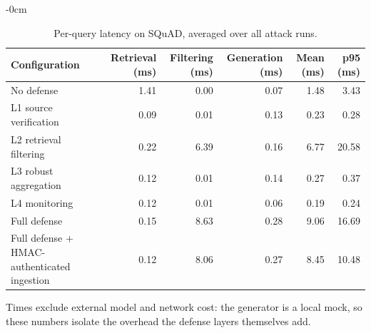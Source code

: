 \begin{table}[t]
\begin{adjustwidth}{-\extralength}{0cm}
\centering
\footnotesize
\setlength{\tabcolsep}{3pt}
\caption{Per-query latency on SQuAD, averaged over all attack runs.\label{tab:latency}}
\begin{tabular}{lrrrrr}
\toprule
\textbf{Configuration} & \textbf{Retrieval (ms)} & \textbf{Filtering (ms)} & \textbf{Generation (ms)} & \textbf{Mean (ms)} & \textbf{p95 (ms)}\\
\midrule
No defense & 1.41 & 0.00 & 0.07 & 1.48 & 3.43\\
L1 source verification & 0.09 & 0.01 & 0.13 & 0.23 & 0.28\\
L2 retrieval filtering & 0.22 & 6.39 & 0.16 & 6.77 & 20.58\\
L3 robust aggregation & 0.12 & 0.01 & 0.14 & 0.27 & 0.37\\
L4 monitoring & 0.12 & 0.01 & 0.06 & 0.19 & 0.24\\
Full defense & 0.15 & 8.63 & 0.28 & 9.06 & 16.69\\
Full defense + HMAC-authenticated ingestion & 0.12 & 8.06 & 0.27 & 8.45 & 10.48\\
\bottomrule
\end{tabular}
\par\vspace{3pt}
\noindent\parbox{\linewidth}{\footnotesize Times exclude external model and network cost: the generator is a local mock, so these numbers isolate the overhead the defense layers themselves add.}
\end{adjustwidth}
\end{table}
